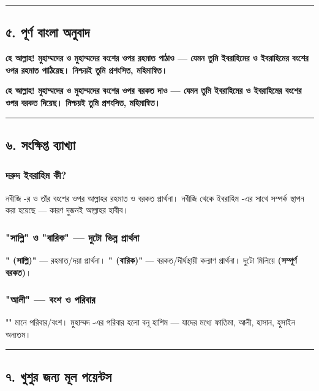 \medskip\hrule\medskip

\subsection*{৫. পূর্ণ বাংলা অনুবাদ}

\textbf{হে আল্লাহ! মুহাম্মদের ও মুহাম্মদের বংশের ওপর রহমাত পাঠাও — যেমন তুমি ইবরাহিমের ও ইবরাহিমের বংশের ওপর রহমাত পাঠিয়েছ। নিশ্চয়ই তুমি প্রশংসিত, মহিমান্বিত।}

\textbf{হে আল্লাহ! মুহাম্মদের ও মুহাম্মদের বংশের ওপর বরকত দাও — যেমন তুমি ইবরাহিমের ও ইবরাহিমের বংশের ওপর বরকত দিয়েছ। নিশ্চয়ই তুমি প্রশংসিত, মহিমান্বিত।}

\medskip\hrule\medskip

\subsection*{৬. সংক্ষিপ্ত ব্যাখ্যা}

\subsubsection*{\textbf{দরুদ ইবরাহিম কী?}}
নবীজি -র ও তাঁর বংশের ওপর আল্লাহর রহমাত ও বরকত প্রার্থনা। নবীজি  থেকে ইবরাহিম -এর সাথে সম্পর্ক স্থাপন করা হয়েছে — কারণ দুজনই আল্লাহর হাবীব।

\subsubsection*{\textbf{"সাল্লি" ও "বারিক" — দুটো ভিন্ন প্রার্থনা}}
\textbf{" (সাল্লি)"} — রহমাত/দয়া প্রার্থনা। \textbf{" (বারিক)"} — বরকত/দীর্ঘস্থায়ী কল্যাণ প্রার্থনা। দুটো মিলিয়ে \textbf{  (সম্পূর্ণ বরকত)}।

\subsubsection*{\textbf{"আলী" — বংশ ও পরিবার}}
"" মানে পরিবার/বংশ। মুহাম্মদ -এর পরিবার হলো বনূ হাশিম — যাদের মধ্যে ফাতিমা, আলী, হাসান, হুসাইন অন্যতম।

\medskip\hrule\medskip

\subsection*{৭. খুশুর জন্য মূল পয়েন্টস}

